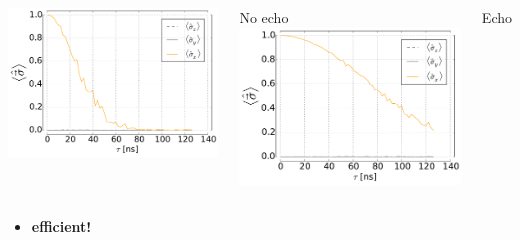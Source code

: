 \documentclass[aspectratio=169, 13pt, t]{beamer}
\begin{document}
\begin{frame}[t]
{	\vspace{0.2cm}
	\begin{columns}[c]
	\centering
	\includegraphics[width=\textwidth]{deph_pink}
	
	No echo
	\centering
	\includegraphics[width=\textwidth]{deph_pink_se}
	
	Echo
	\end{columns}
	
	
	\vspace{0.2cm}
	\begin{itemize}
	\centering	
	\item \bf efficient!
	\end{itemize}
}
\end{frame}
\end{document}

